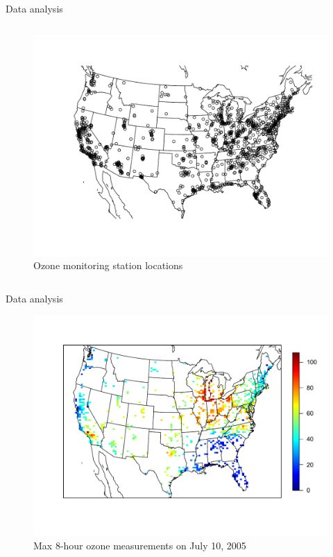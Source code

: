 \documentclass{beamer}
\begin{document}
\begin{frame}{Data analysis}
\begin{columns}[c]
	\begin{figure}
    \includegraphics[width=1\linewidth]{./plots/pot/ozone_stations.pdf}
    \caption{Ozone monitoring station locations}
    \end{figure}
\end{columns}
\end{frame}

\begin{frame}{Data analysis}
  \centering
  \begin{figure}
    \includegraphics[width=\linewidth, trim=0 1in 0 0.7in ]{./plots/pot/ozone-10jul-us.pdf}
    \caption{Max 8-hour ozone measurements on July 10, 2005}
   \end{figure}
\end{frame}
\end{document}
